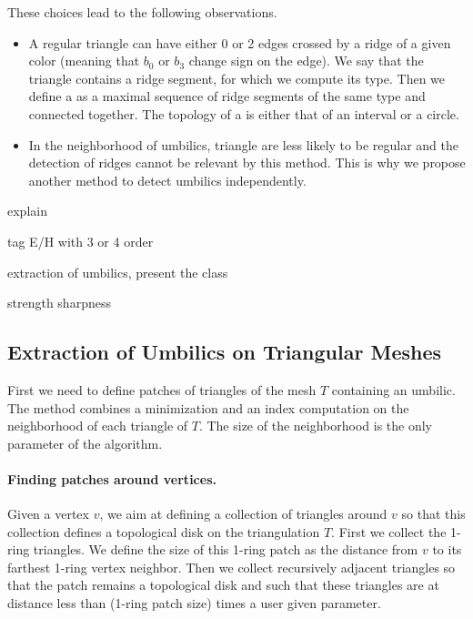 These choices lead to the following observations.
\begin{itemize}
\item
A regular triangle can have either 0 or 2 edges crossed by a ridge of
a given color (meaning that $b_0$ or $b_3$ change sign on the
edge). We say that the triangle contains a ridge segment, for which we
compute its type.  Then we define a
 as a maximal sequence of ridge segments of the 
same type and connected together.  The topology of a 
is either that of an interval or a circle.
\item
In the neighborhood of umbilics, triangle are less likely to be
regular and the detection of ridges cannot be relevant by this method.
This is why we propose another method to detect umbilics
independently.
\end{itemize}


explain

tag E/H with 3 or 4 order

extraction of umbilics, present the class 

strength sharpness

\subsection{Extraction of Umbilics on Triangular Meshes}

First we need to define patches of triangles of the mesh $T$
containing an umbilic.  The method combines a minimization and an
index computation on the neighborhood of each triangle of $T$. The
size of the neighborhood is the only parameter of the algorithm.

\paragraph{Finding patches around vertices.}
Given a vertex $v$, we aim at defining a collection of triangles
around $v$ so that this collection defines a topological disk on the
triangulation $T$. First we collect the 1-ring triangles. We define
the size of this 1-ring patch as the distance from $v$ to its farthest
1-ring vertex neighbor. Then we collect recursively adjacent triangles
so that the patch remains a topological disk and such that these
triangles are at distance less than (1-ring patch size) times a user
given parameter.

